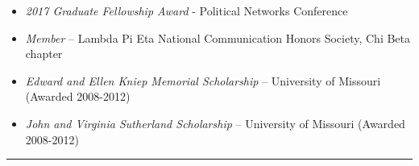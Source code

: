 \documentclass[letterpaper, 9pt]{extarticle}
\begin{document}
{\begin{itemize}[leftmargin=!,labelindent=-10pt,itemindent=0pt]
\vspace{-6pt}
\item \textit{2017 Graduate Fellowship Award} - Political Networks Conference

\vspace{-6pt}
\item \textit{Member} -- Lambda Pi Eta National Communication Honors Society, Chi Beta chapter

\vspace{-6pt}
\item \textit{Edward and Ellen Kniep Memorial Scholarship} -- University of Missouri (Awarded 2008-2012)

\vspace{-6pt}
\item \textit{John and Virginia Sutherland Scholarship} -- University of Missouri (Awarded 2008-2012)
\end{itemize}

\vspace{-10pt}

\rule{\textwidth}{0.25pt}
}
\end{document}
